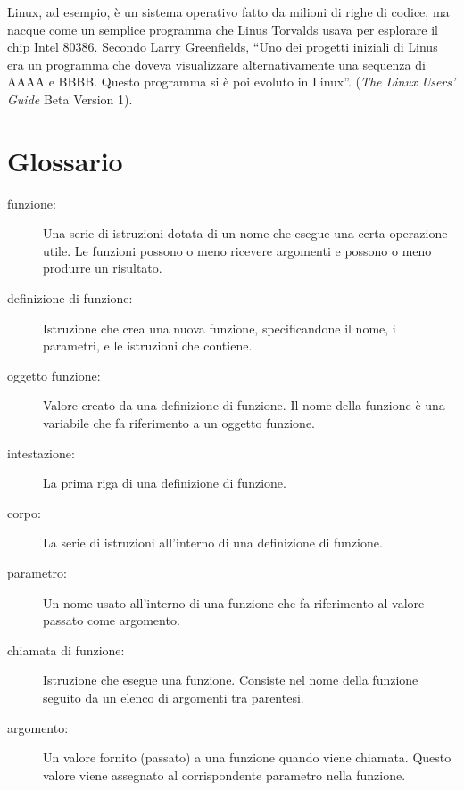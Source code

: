 \documentclass[10pt]{book}
\begin{document}
Linux, ad esempio, è un sistema operativo fatto da milioni di righe di codice, ma nacque come un semplice programma che Linus Torvalds usava per esplorare il chip Intel 80386. Secondo Larry Greenfields, ``Uno dei progetti iniziali di Linus era un programma che doveva visualizzare alternativamente una sequenza di AAAA e BBBB. Questo programma si è poi evoluto in Linux''. ({\em The Linux Users' Guide} Beta Version 1).

\section{Glossario}

\begin{description}

\item[funzione:] Una serie di istruzioni dotata di un nome che esegue una certa operazione utile. Le funzioni possono o meno ricevere argomenti e possono o meno produrre un risultato.

\item[definizione di funzione:]  Istruzione che crea una nuova funzione, specificandone il nome, i parametri, e le istruzioni che contiene.

\item[oggetto funzione:]  Valore creato da una definizione di funzione. Il nome della funzione è una variabile che fa riferimento a un oggetto funzione.

\item[intestazione:] La prima riga di una definizione di funzione.

\item[corpo:] La serie di istruzioni all'interno di una definizione di funzione.

\item[parametro:] Un nome usato all'interno di una funzione che fa riferimento al valore passato come argomento.

\item[chiamata di funzione:] Istruzione che esegue una funzione. Consiste nel nome della funzione seguito da un elenco di argomenti tra parentesi.

\item[argomento:]  Un valore fornito (passato) a una funzione quando viene chiamata. Questo valore viene assegnato al corrispondente parametro nella funzione.


\end{description}
\end{document}
